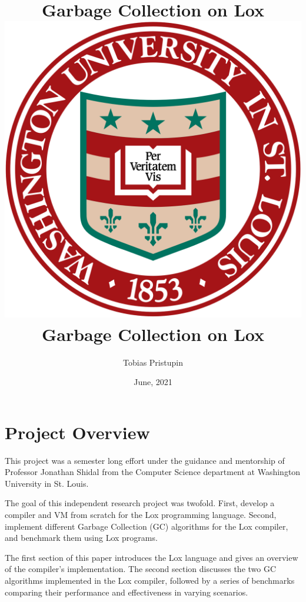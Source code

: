 \documentclass[10pt]{extarticle}
\title{Garbage Collection on Lox}
\author{Tobias Pristupin}
\date{June, 2021}
\begin{document}
\title{\vspace{-2.0cm}\includegraphics[scale=0.1]{washu_logo.png} 
\\[1cm]
Garbage Collection on Lox}
\maketitle
\tableofcontents

\section{Project Overview}
This project was a semester long effort under the guidance and mentorship of Professor Jonathan Shidal from the Computer Science department at Washington University in St. Louis.

\medskip
The goal of this independent research project was twofold. First, develop a compiler and VM from scratch for the Lox programming language. Second, implement different Garbage Collection (GC) algorithms for the Lox compiler, and benchmark them using Lox programs. 

The first section of this paper introduces the Lox language and gives an overview of the compiler's implementation. The second section discusses the two GC algorithms implemented in the Lox compiler, followed by a series of benchmarks comparing their performance and effectiveness in varying scenarios.
\end{document}
